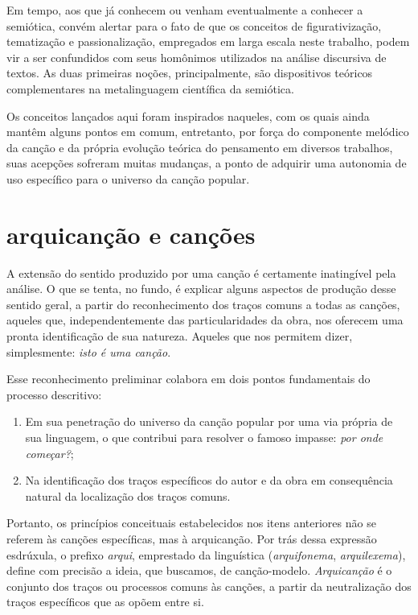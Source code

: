 Em tempo, aos que já conhecem ou venham eventualmente a conhecer a
semiótica, convém alertar para o fato de que os conceitos de
figurativização, tematização e passionalização, empregados em larga
escala neste trabalho, podem vir a ser confundidos com seus homônimos
utilizados na análise discursiva de textos. As duas primeiras noções,
principalmente, são dispositivos teóricos complementares na
metalinguagem científica da semiótica.

Os conceitos lançados aqui foram inspirados naqueles, com os quais ainda
mantêm alguns pontos em comum, entretanto, por força do componente
melódico da canção e da própria evolução teórica do pensamento em
diversos trabalhos, suas acepções sofreram muitas mudanças, a ponto de
adquirir uma autonomia de uso específico para o universo da canção
popular.

\section{arquicanção e canções}

A extensão do sentido produzido por uma canção é certamente inatingível
pela análise. O que se tenta, no fundo, é explicar alguns aspectos de
produção desse sentido geral, a partir do reconhecimento dos traços
comuns a todas as canções, aqueles que, independentemente das
particularidades da obra, nos oferecem uma pronta identificação de sua
natureza. Aqueles que nos permitem dizer, simplesmente: \textit{isto é uma
canção}.

Esse reconhecimento preliminar colabora em dois pontos fundamentais do
processo descritivo:

\begin{enumerate}%
\item Em sua penetração do universo da canção popular por uma via própria
de sua linguagem, o que contribui para resolver o famoso impasse: \textit{por
onde começar?};

\item Na identificação dos traços específicos do autor e da obra em
consequência natural da localização dos traços comuns.
\end{enumerate}

Portanto, os princípios conceituais estabelecidos nos itens anteriores
não se referem às canções específicas, mas à arquicanção. Por trás dessa
expressão esdrúxula, o prefixo \textit{arqui}, emprestado da linguística
(\textit{arquifonema}, \textit{arquilexema}), define com precisão a ideia, que buscamos,
de canção-modelo. \textit{Arquicanção} é o conjunto dos traços ou processos
comuns às canções, a partir da neutralização dos traços específicos que
as opõem entre si.

